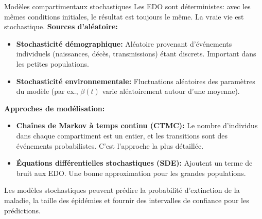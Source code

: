 \documentclass[aspectratio=169]{beamer}\usepackage[]{graphicx}\usepackage[]{xcolor}
\begin{document}

\begin{frame}{Modèles compartimentaux stochastiques}
    Les EDO sont déterministes: avec les mêmes conditions initiales, le résultat est toujours le même. La vraie vie est stochastique.
    \vfill
    \textbf{Sources d'aléatoire:}
    \begin{itemize}
        \item \textbf{Stochasticité démographique:} Aléatoire provenant d'événements individuels (naissances, décès, transmissions) étant discrets. Important dans les petites populations.
        \item \textbf{Stochasticité environnementale:} Fluctuations aléatoires des paramètres du modèle (par ex., $\beta(t)$ varie aléatoirement autour d'une moyenne).
    \end{itemize}
    \vfill
    \textbf{Approches de modélisation:}
    \begin{itemize}
        \item \textbf{Chaînes de Markov à temps continu (CTMC):} Le nombre d'individus dans chaque compartiment est un entier, et les transitions sont des événements probabilistes. C'est l'approche la plus détaillée.
        \item \textbf{Équations différentielles stochastiques (SDE):} Ajoutent un terme de bruit aux EDO. Une bonne approximation pour les grandes populations.
    \end{itemize}
    \vfill
    Les modèles stochastiques peuvent prédire la probabilité d'extinction de la maladie, la taille des épidémies et fournir des intervalles de confiance pour les prédictions.
\end{frame}
\end{document}
